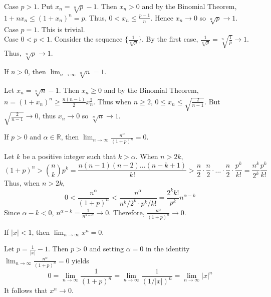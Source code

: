 \documentclass{mathnotes}
\newcommand{\rr}{\mathbb{R}}
\begin{document}
\begin{pf}
  Case $p>1$. Put $x_n=\sqrt[n]{p}-1$. Then $x_n>0$ and by the Binomial
  Theorem, $1+nx_n\le(1+x_n)^n=p$. Thus, $0<x_n\le\frac{p-1}{n}$. Hence
  $x_n\to0$ so $\sqrt[n]{p}\to1$.\\
  Case $p=1$. This is trivial.\\
  Case $0<p<1$. Consider the sequence $\{\frac{1}{\sqrt[n]{p}}\}$. By the first
  case, $\frac{1}{\sqrt[n]{p}}=\sqrt[n]{\frac{1}{p}}\to1$. Thus,
  $\sqrt[n]{p}\to1$.
\end{pf}

\begin{prop}
  If $n>0$, then $\lim_{n\to\infty}\sqrt[n]{n}=1$.
\end{prop}

\begin{pf}
  Let $x_n=\sqrt[n]{n}-1$. Then $x_n\ge0$ and by the Binomial Theorem,
  $n=(1+x_n)^n\ge\frac{n(n-1)}{2}x_n^2$. Thus when $n\ge2$, $0\le
  x_n\le\sqrt{\frac{2}{n-1}}$. But $\sqrt{\frac{2}{n-1}}\to0$, thus $x_n\to 0$
  so $\sqrt[n]{n}\to1$.
\end{pf}

\begin{prop}
  If $p>0$ and $\alpha\in\rr$, then
  $\lim_{n\to\infty}\frac{n^\alpha}{(1+p)^n}=0$.
\end{prop}

\begin{pf}
  Let $k$ be a positive integer such that $k>\alpha$. When $n>2k$,
  $$(1+p)^n>\binom{n}{k}p^k=\frac{n(n-1)(n-2)\ldots(n-k+1)}{k!}>
  \frac{n}{2}\cdot\frac{n}{2}\cdot\ldots\cdot\frac{n}{2}
  \cdot\frac{p^k}{k!}=\frac{n^k}{2^k}\frac{p^k}{k!}$$
  Thus, when $n>2k$,
  $$0<\frac{n^\alpha}{(1+p)^n}<\frac{n^\alpha}{n^k/2^k\cdot
  p^k/k!}=\frac{2^kk!}{p^k}n^{\alpha-k}$$
  Since $\alpha-k<0$, $n^{\alpha-k}=\frac{1}{n^{k-\alpha}}\to0$. Therefore,
  $\frac{n^\alpha}{(1+p)^n}\to0$.
\end{pf}

\begin{prop}
  If $|x|<1$, then $\lim_{n\to\infty}x^n=0$.
\end{prop}

\begin{pf}
  Let $p=\frac{1}{|x|}-1$. Then $p>0$ and setting $\alpha=0$ in the identity
  $\lim_{n\to\infty}\frac{n^\alpha}{(1+p)^n}=0$ yields
  $$0=\lim_{n\to\infty}\frac{1}{(1+p)^n}=\lim_{n\to\infty}\frac{1}{(1/|x|)^n}
  =\lim_{n\to\infty}|x|^n$$
  It follows that $x^n\to0$.
\end{pf}
\end{document}
